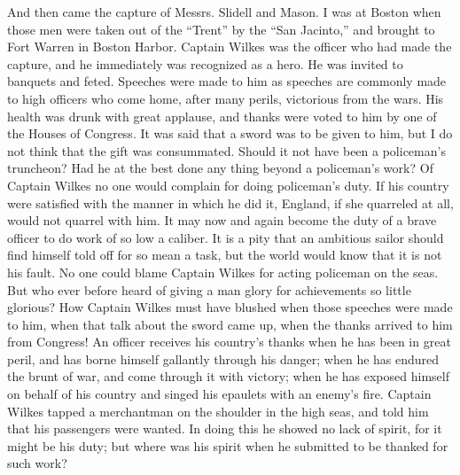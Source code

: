 And then came the capture of Messrs. Slidell and Mason.  I was at
Boston when those men were taken out of the ``Trent'' by the ``San
Jacinto,'' and brought to Fort Warren in Boston Harbor.  Captain
Wilkes was the officer who had made the capture, and he immediately
was recognized as a hero.  He was invited to banquets and feted.
Speeches were made to him as speeches are commonly made to high
officers who come home, after many perils, victorious from the
wars.  His health was drunk with great applause, and thanks were
voted to him by one of the Houses of Congress.  It was said that a
sword was to be given to him, but I do not think that the gift was
consummated.  Should it not have been a policeman's truncheon?  Had
he at the best done any thing beyond a policeman's work?  Of
Captain Wilkes no one would complain for doing policeman's duty.
If his country were satisfied with the manner in which he did it,
England, if she quarreled at all, would not quarrel with him.  It
may now and again become the duty of a brave officer to do work of
so low a caliber.  It is a pity that an ambitious sailor should
find himself told off for so mean a task, but the world would know
that it is not his fault.  No one could blame Captain Wilkes for
acting policeman on the seas.  But who ever before heard of giving
a man glory for achievements so little glorious?  How Captain
Wilkes must have blushed when those speeches were made to him, when
that talk about the sword came up, when the thanks arrived to him
from Congress!  An officer receives his country's thanks when he
has been in great peril, and has borne himself gallantly through
his danger; when he has endured the brunt of war, and come through
it with victory; when he has exposed himself on behalf of his
country and singed his epaulets with an enemy's fire.  Captain
Wilkes tapped a merchantman on the shoulder in the high seas, and
told him that his passengers were wanted.  In doing this he showed
no lack of spirit, for it might be his duty; but where was his
spirit when he submitted to be thanked for such work?

